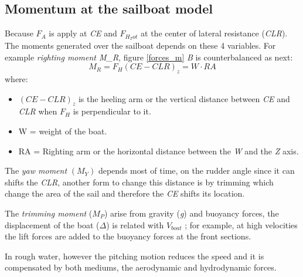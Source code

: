 \subsection{Momentum at the sailboat model}
Because $F_{A}$ is apply at \textit{CE} and $F_{H_Tot}$ at the center of lateral resistance (\textit{CLR}). The moments generated over the sailboat depends on these 4 variables. For example \textit{righting moment M_{R}}, figure \ref{forces_m} \textit{B} is counterbalanced as next: 
\begin{equation}\label{eq:right_mom}
    M_{R}=F_{H}(CE-CLR)_{z}=W \cdot RA
\end{equation}
where:\par
\begin{itemize}
    \item $(CE-CLR)_{z}$ is the heeling arm or the vertical distance between \textit{CE} and \textit{CLR} when $F_{H}$ is perpendicular to it.
    \item W = weight of the boat.
    \item RA = Righting arm or the horizontal distance between the \textit{W} and the \textit{Z} axis.
\end{itemize}
The \textit{yaw moment} $(M_{Y})$ depends most of time, on the rudder angle since it can shifts the \textit{CLR}, another form to change this distance is by trimming which change the area of the sail and therefore the \textit{CE} shifts its location.\par 
The \textit{trimming moment} ($M_{P}$) arise from gravity (\textit{g}) and buoyancy forces, the displacement of the boat (\textit{$\Delta$}) is related with $V_{boat}$ ; for example, at high velocities the lift forces are added to the buoyancy forces at the front sections.\par 
In rough water, however the pitching motion reduces the speed and it is compensated by both mediums, the aerodynamic and hydrodynamic forces.\par %

